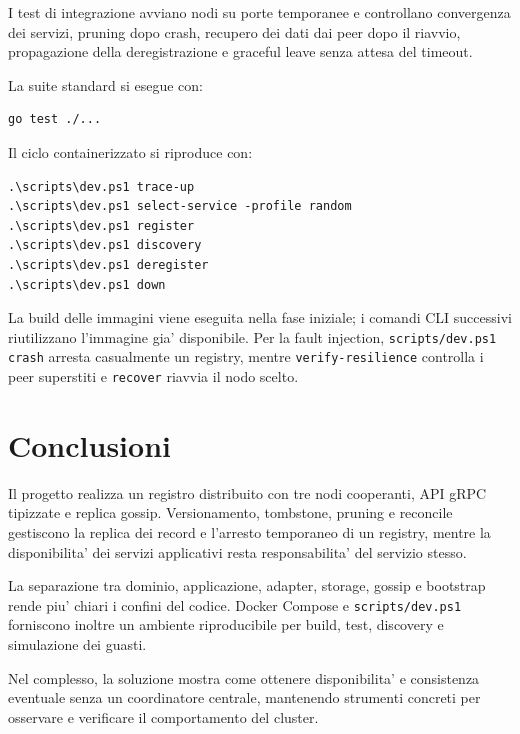 \documentclass[conference]{IEEEtran}
\begin{document}
I test di integrazione avviano nodi su porte temporanee e controllano convergenza dei servizi, pruning dopo crash, recupero dei dati dai peer dopo il riavvio, propagazione della deregistrazione e graceful leave senza attesa del timeout.

La suite standard si esegue con:
\begin{verbatim}
go test ./...
\end{verbatim}

Il ciclo containerizzato si riproduce con:
\begin{verbatim}
.\scripts\dev.ps1 trace-up
.\scripts\dev.ps1 select-service -profile random
.\scripts\dev.ps1 register
.\scripts\dev.ps1 discovery
.\scripts\dev.ps1 deregister
.\scripts\dev.ps1 down
\end{verbatim}

La build delle immagini viene eseguita nella fase iniziale; i comandi CLI successivi riutilizzano l'immagine gia' disponibile. Per la fault injection, \texttt{scripts/dev.ps1 crash} arresta casualmente un registry, mentre \texttt{verify-resilience} controlla i peer superstiti e \texttt{recover} riavvia il nodo scelto.
\section{Conclusioni}
Il progetto realizza un registro distribuito con tre nodi cooperanti, API gRPC tipizzate e replica gossip. Versionamento, tombstone, pruning e reconcile gestiscono la replica dei record e l'arresto temporaneo di un registry, mentre la disponibilita' dei servizi applicativi resta responsabilita' del servizio stesso.

La separazione tra dominio, applicazione, adapter, storage, gossip e bootstrap rende piu' chiari i confini del codice. Docker Compose e \texttt{scripts/dev.ps1} forniscono inoltre un ambiente riproducibile per build, test, discovery e simulazione dei guasti.

Nel complesso, la soluzione mostra come ottenere disponibilita' e consistenza eventuale senza un coordinatore centrale, mantenendo strumenti concreti per osservare e verificare il comportamento del cluster.
\end{document}
